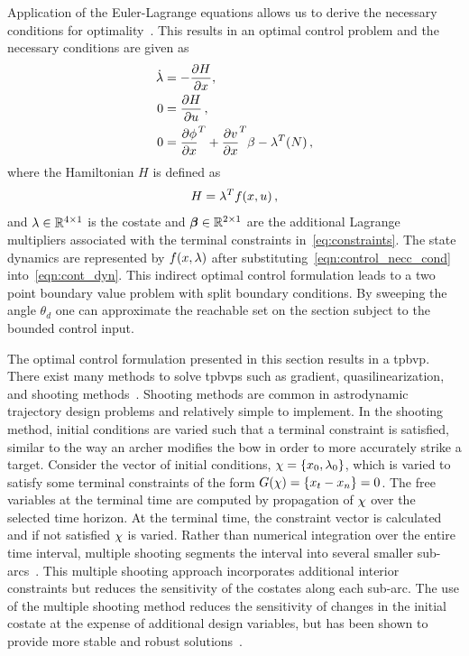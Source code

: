 Application of the Euler-Lagrange equations allows us to derive the necessary conditions for optimality~\cite{bryson1975}.
This results in an optimal control problem and the necessary conditions are given as
\begin{subequations}\label{eq:necc_cond}
\begin{align}
    \dot{\lambda} &= - \frac{\partial H}{\partial x}, \\
        0 &=  \frac{\partial H}{\partial u} \, , \label{eqn:control_necc_cond}\\
        0 &= \frac{\partial \phi}{\partial x}^T + \frac{\partial v}{\partial x}^T \beta  - \lambda^T(N) \, ,  
\end{align}
\end{subequations}
where the Hamiltonian \(H\) is defined as
\begin{equation}
        H = \lambda^T f(x, u) \, ,
        \label{eq:hamiltonian_opt}
\end{equation}
and \( \lambda \in \mathbb{R}^{4 \times 1} \) is the costate and \(\bm{\beta} \in \mathbb{R}^{2 \times 1} \) are the additional Lagrange multipliers associated with the terminal constraints in~\cref{eq:constraints}.
The state dynamics are represented by \( f(x, \lambda ) \) after substituting~\cref{eqn:control_necc_cond} into~\cref{eqn:cont_dyn}.
This indirect optimal control formulation leads to a two point boundary value problem with split boundary conditions. 
By sweeping the angle \( \theta_d \) one can approximate the reachable set on the \Poincare section subject to the bounded control input. 

The optimal control formulation presented in this section results in a \gls{tpbvp}. 
There exist many methods to solve \glspl{tpbvp} such as gradient, quasilinearization, and shooting methods~\cite{bryson1975,kirk2012}.
Shooting methods are common in astrodynamic trajectory design problems and relatively simple to implement.
In the shooting method, initial conditions are varied such that a terminal constraint is satisfied, similar to the way an archer modifies the bow in order to more accurately strike a target. 
Consider the vector of initial conditions, \( \chi = \left\{ x_0, \lambda_0 \right\}\), which is varied to satisfy some terminal constraints of the form \( G(\chi) = \left\{ x_t - x_n \right\} = 0 \).
The free variables at the terminal time are computed by propagation of \( \chi \) over the selected time horizon. 
At the terminal time, the constraint vector is calculated and if not satisfied \( \chi\) is varied.
Rather than numerical integration over the entire time interval, multiple shooting segments the interval into several smaller sub-arcs~\cite{stoer2013}.
This multiple shooting approach incorporates additional interior constraints but reduces the sensitivity of the costates along each sub-arc.
The use of the multiple shooting method reduces the sensitivity of changes in the initial costate at the expense of additional design variables, but has been shown to provide more stable and robust solutions~\cite{ozimek2010a}.

